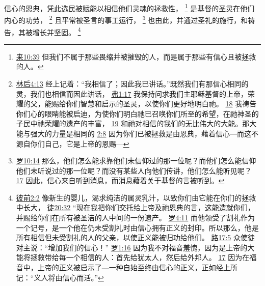 \documentclass[12pt, a4paper, oneside]{ctexart}
\newcounter{parnum}[section]
\newcommand{\N}{%
   \noindent\refstepcounter{parnum}%
    \makebox[\parindent][l]{\textbf{\arabic{parnum}.}}}
\begin{document}
\N 信心的恩典，凭此选民被赋能以相信他们灵魂的拯救性，
	\footnote {
		\href{https://biblehub.com/hebrews/10-39.htm}{来10:39} 但我们不属于那些畏缩并被摧毁的人，而是属于那些有信心且被拯救的人。
	}
	是基督的圣灵在他们内心的功劳，
	\footnote {
		\href{https://biblehub.com/2_corinthians/4-13.htm}{林后4:13} 经上记着：“我相信了；因此我已讲话。”既然我们有那信心相同的灵，我们也相信而因此讲话，
		\href{https://biblehub.com/ephesians/1-17.htm}{弗1:17} 我保持问求我们主耶稣基督的上帝，荣耀的父，能赐给你们智慧和启示的圣灵，以使你们更好地明白祂。
		\href{https://biblehub.com/ephesians/1-18.htm}{18} 我祷告你们心的眼睛能被启迪，为使你们明白祂已召唤你们所至的希望，在祂神圣的子民中祂荣耀的遗产的丰富，
		\href{https://biblehub.com/ephesians/1-19.htm}{19} 和祂对相信的我们的无比伟大的大能。那大能与强大的力量是相同的
		\href{https://biblehub.com/ephesians/2-8.htm}{2:8} 因为你们已被拯救是由恩典，藉着信心---而这不源自你们自己，它是上帝的恩赐---
	}
	且平常被圣言的事工运行，
	\footnote {
		\href{https://biblehub.com/romans/10-14.htm}{罗10:14} 那么，他们怎么能求靠他们未信仰过的那一位呢？而他们怎么能信仰他们未听说过的那一位呢？而没有某些人向他们传讲，他们怎么能听见呢？
		\href{https://biblehub.com/romans/10-17.htm}{17} 因此，信心来自听到消息，而消息藉着关于基督的言被听到。
	}
	也由此，并通过圣礼的施行，和祷告，其被增长并坚固。
	\footnote {
		\href{https://biblehub.com/1_peter/2-2.htm}{彼前2:2} 像新生的婴儿，渴求纯洁的属灵乳汁，以致你们由它能在你们的拯救中长大，
		\href{https://biblehub.com/acts/20-32.htm}{徒20:32} “现在我把你们交托给上帝及祂恩典的言，这能造就你们，并赐给你们在所有被圣洁的人中间的一份遗产。
		\href{https://biblehub.com/romans/4-11.htm}{罗4:11} 而他领受了割礼作为一个记号，是一个他在仍未受割礼时由信心拥有正义的封印。所以那么，他是所有相信但未受割礼的人的父亲，以使正义能被归功给他们。
		\href{https://biblehub.com/luke/17-5.htm}{路17:5} 众使徒对主说：“增加我们的信心！”
		\href{https://biblehub.com/romans/1-16.htm}{罗1:16} 因为我不对福音羞愧，因为是上帝的大能将拯救带给每一个相信的人：首先给犹太人，然后给外邦人。
		\href{https://biblehub.com/romans/1-17.htm}{17} 因为在福音中，上帝的正义被启示了---一种自始至终由信心的正义，正如经上所记：“义人将由信心而活。”
	}
\end{document}
